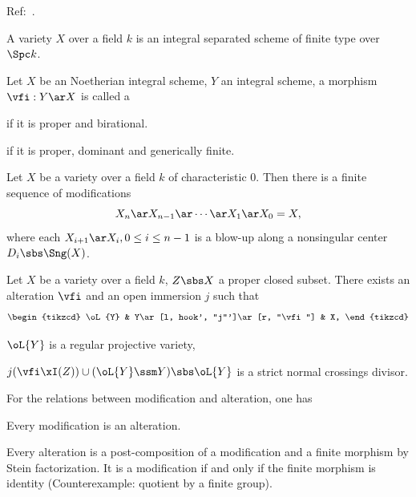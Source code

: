 \documentclass[a4paper, twoside]{article}
\begin{document}
\confighead{}{}{}

Ref:~\cite{Hironaka1964,deJong1996}.


\begin{stp}
	A variety $X$ over a field $k$ is an integral separated scheme of finite type over $\Spc k$.
\end{stp}

\begin{dfn}
	Let $X$ be an Noetherian integral scheme, $Y$ an integral scheme, a morphism $\vfi:Y\ar X$ is called a
	\begin{enr}
		\item \cite[2.17]{deJong1996}  if it is proper and birational.
		\item \cite[2.20]{deJong1996}  if it is proper, dominant and generically finite.
	\end{enr}
\end{dfn}


\begin{thm}
	Let $X$ be a variety over a field $k$ of characteristic $0$. Then there is a finite sequence of modifications
	\[
		X_{n}\ar X_{n-1}\ar\cdots\ar X_{1}\ar X_{0}=X,
	\]
	where each $X_{i+1}\ar X_{i}, 0\leq i\leq n-1$ is a blow-up along a nonsingular center $D_{i}\sbs\Sng(X)$.
\end{thm}


\begin{thm}
	Let $X$ be a variety over a field $k$, $Z\sbs X$ a proper closed subset. There exists an alteration $\vfi$ and an open immersion $j$ such that
	\[
		\begin{tikzcd}
			\oL{Y} & Y\ar[l, hook', "j"']\ar[r, "\vfi"] & X,
		\end{tikzcd}
	\]
	\begin{enr}
		\item $\oL{Y}$ is a regular projective variety,
		\item $j(\vfi\xI(Z))\cup(\oL{Y}\ssm Y)\sbs \oL{Y}$ is a strict normal crossings divisor.
	\end{enr}
\end{thm}


\begin{rmk}
	For the relations between modification and alteration, one has
	\begin{itm}
		\item Every modification is an alteration.
		\item Every alteration is a post-composition of a modification and a finite morphism by Stein factorization. It is a modification if and only if the finite morphism is identity (Counterexample: quotient by a finite group).
	\end{itm}
\end{rmk}



\printref
\end{document}
